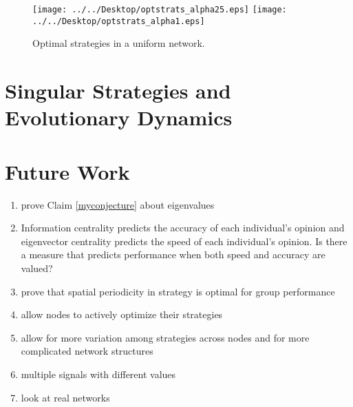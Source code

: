 \documentclass{article}
\begin{document}
\begin{figure}
\texttt{[image: ../../Desktop/optstrats\_alpha25.eps]}
\texttt{[image: ../../Desktop/optstrats\_alpha1.eps]}
\caption{Optimal strategies in a uniform network. \label{opt}}
\end{figure}

\section{Singular Strategies and Evolutionary Dynamics}




\section{Future Work}

\begin{enumerate}
\item prove Claim \ref{myconjecture} about eigenvalues
\item Information centrality predicts the accuracy of each individual's opinion and eigenvector centrality predicts the speed of each individual's opinion.  Is there a measure that predicts performance when both speed and accuracy are valued?
\item prove that spatial periodicity in strategy is optimal for group performance
\item allow nodes to actively optimize their strategies 
 \item allow for more variation among strategies across nodes and for more complicated network structures
  \item multiple signals with different values 
\item look at real networks
\end{enumerate}

%
\end{document}
